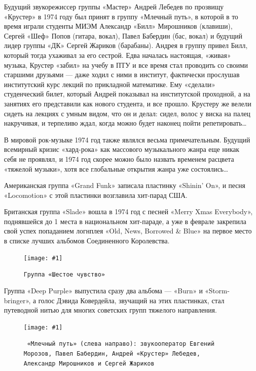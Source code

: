\documentclass[10pt, twoside]{book}
\newcommand{\myincludegraphics}[1]{\texttt{[image: \#1]}}
\begin{document}
Будущий звукорежиссер группы «Мастер» Андрей Лебедев по прозвищу «Крустер» в 1974 году был принят в группу «Млечный
путь», в которой в то время играли студенты МИЭМ Александр «Билл» Мирошников (клавиши), Сергей «Шеф» Попов (гитара,
вокал), Павел Бабердин (бас, вокал) и будущий лидер группы «ДК» Сергей Жариков (барабаны). Андрея в группу привел Билл,
который тогда ухаживал за его сестрой. Едва началась настоящая, «живая» музыка, Крустер «забил» на учебу в ПТУ и все
время стал проводить со своими старшими друзьями — даже ходил с ними в институт, фактически прослушав институтский курс
лекций по прикладной математике. Ему «сделали» студенческий билет, который Андрей показывал на институтской проходной,
а на занятиях его представили как нового студента, и все прошло. Крустеру же велели сидеть на лекциях с умным видом, что
он и делал: сидел, волос у виска на палец накручивая, и терпеливо ждал, когда можно будет наконец пойти
репетировать\ldots

В мировой рок-музыке 1974 год также являлся весьма примечательным. Будущий всемирный кризис «хард-рока» как массового
музыкального жанра еще никак себя не проявлял, и 1974 год скорее можно было назвать временем расцвета «тяжелой музыки»,
хотя все глобальные открытия жанра уже состоялись\ldots

Американская группа «Grand Funk» записала пластинку «Shinin' On», и песня «Locomotion» с этой пластинки возглавила
хит-парад США.

Британская группа «Slade» вошла в 1974 год с песней «Merry Xmas Everybody», поднявшейся до 1 места в национальном
хит-параде, а уже в феврале закрепила свой успех попаданием логнплея «Old, News, Borrowed \& Blue» на первое место в
списке лучших альбомов Соединенного Королевства.

\begin{figure}
    \centering
    \myincludegraphics{Image03}
    \caption{\texttt{Группа «Шестое чувство»}}
\end{figure}

Группа «Deep Purple» выпустила сразу два альбома — «Burn» и «Storm-bringer», а голос Дэвида Ковердейла, звучащий на этих
пластинках, стал путеводной нитью для многих советских групп тяжелого направления.

\begin{figure}[h]
    \centering
    \myincludegraphics{Image04}
    \caption{\texttt{
        «Млечный путь» (слева направо): звукооператор Евгений Морозов, Павел Бабердин, Андрей «Крустер» Лебедев,
        Александр Мирошников и Сергей Жариков
    }}
\end{figure}
\end{document}
